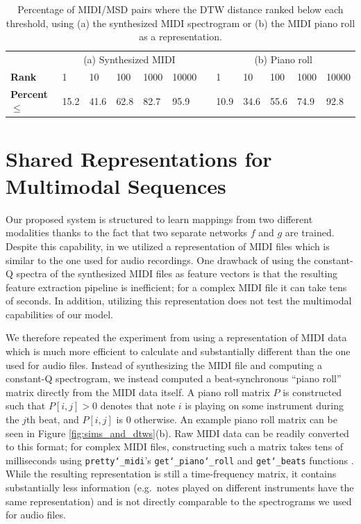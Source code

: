 \documentclass{article} %
\begin{document}
\begin{table}
  \begin{center}
    \begin{tabular}{l l l l l l l l l l l l}
      \toprule
      & \multicolumn{5}{c}{(a) Synthesized MIDI} & &  \multicolumn{5}{c}{(b) Piano roll} \\
      \cmidrule{2-6}
      \cmidrule{8-12}
      \textbf{Rank} & 1 & 10 & 100 & 1000 & 10000 & & 1 & 10 & 100 & 1000 & 10000 \\
      \textbf{Percent $\le$} & 15.2 & 41.6 & 62.8 & 82.7 & 95.9 & & 10.9 & 34.6 & 55.6 & 74.9 & 92.8 \\
      \bottomrule
    \end{tabular}
  \end{center}
  \caption{Percentage of MIDI/MSD pairs where the DTW distance ranked below each threshold, using (a) the synthesized MIDI spectrogram or (b) the MIDI piano roll as a representation.}
  \label{tab:rank-percentages}
\end{table}

\section{Shared Representations for Multimodal Sequences}
\label{sec:multimodal}

Our proposed system is structured to learn mappings from two different modalities thanks to the fact that two separate networks $f$ and $g$ are trained.
Despite this capability, in \cite{raffel2015large} we utilized a representation of MIDI files which is similar to the one used for audio recordings.
One drawback of using the constant-Q spectra of the synthesized MIDI files as feature vectors is that the resulting feature extraction pipeline is inefficient; for a complex MIDI file it can take tens of seconds.
In addition, utilizing this representation does not test the multimodal capabilities of our model.

We therefore repeated the experiment from \cite{raffel2015large} using a representation of MIDI data which is much more efficient to calculate and substantially different than the one used for audio files.
Instead of synthesizing the MIDI file and computing a constant-Q spectrogram, we instead computed a beat-synchronous ``piano roll'' matrix directly from the MIDI data itself.
A piano roll matrix $P$ is constructed such that $P[i, j] > 0$ denotes that note $i$ is playing on some instrument during the $j$th beat, and $P[i, j]$ is $0$ otherwise.
An example piano roll matrix can be seen in Figure \ref{fig:sims_and_dtws}(b).
Raw MIDI data can be readily converted to this format; for complex MIDI files, constructing such a matrix takes tens of milliseconds using \texttt{pretty\char`_midi}'s \texttt{get\char`_piano\char`_roll} and \texttt{get\char`_beats} functions \cite{raffel2014pretty_midi}.
While the resulting representation is still a time-frequency matrix, it contains substantially less information (e.g.\ notes played on different instruments have the same representation) and is not directly comparable to the spectrograms we used for audio files.
\end{document}
